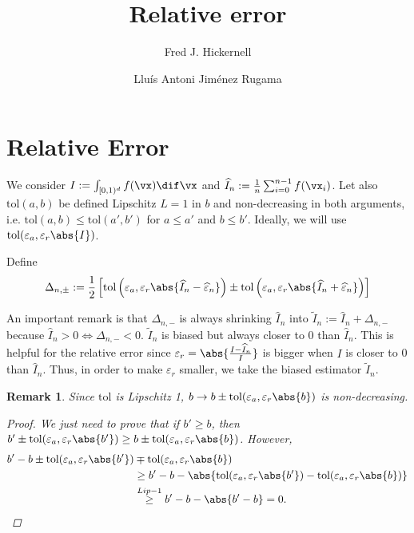\documentclass[]{elsarticle}
\newtheorem{remark}{Remark}
\theoremstyle{definition}
\newcommand{\cube}{[0,1)^d}
\newcommand{\tol}{\text{tol}}
\begin{document}
\begin{frontmatter}

\title{Relative error}
\author{Fred J. Hickernell}
\address{Room E1-208, Department of Applied Mathematics, Illinois Institute of Technology,\\ 10 W.\ 32$^{\text{nd}}$ St., Chicago, IL 60616}
\author{Llu\'{i}s Antoni Jim\'{e}nez Rugama}
\address{Room E1-120, Department of Applied Mathematics, Illinois Institute of Technology,\\ 10 W.\ 32$^{\text{nd}}$ St., Chicago, IL 60616}
\begin{abstract}
\end{abstract}

\end{frontmatter}

\section{Relative Error}
We consider $I:=\int_{\cube}f(\vx)\dif \vx$ and $\widehat{I}_n:=\frac 1 n \sum_{i=0}^{n-1}f(\vx_i)$. Let also $\tol(a,b)$ be defined Lipschitz $L=1$ in $b$ and non-decreasing in both arguments, i.e. $\tol(a,b)\leq \tol(a',b')$ for $a\leq a'$ and $b\leq b'$. Ideally, we will use $\tol(\varepsilon_a,\varepsilon_r\abs{I})$.

Define
\[ 
\Delta_{n,\pm}:=\frac 1 2 \left[ \tol\left(\varepsilon_a,\varepsilon_r\abs{\widehat{I}_n-\widehat{\varepsilon}_n}\right) \pm \tol\left(\varepsilon_a,\varepsilon_r\abs{\widehat{I}_n+\widehat{\varepsilon}_n}\right) \right]
\]

An important remark is that $\Delta_{n,-}$ is always shrinking $\widehat{I}_n$ into $\widetilde{I}_n:=\widehat{I}_n+\Delta_{n,-}$ because $\widehat{I}_n>0\Longleftrightarrow\Delta_{n,-}<0$. $\widetilde{I}_n$ is biased but always closer to 0 than $\widehat{I}_n$. This is helpful for the relative error since $\varepsilon_r=\abs{\frac{I-\widehat{I}_n}{I}}$ is bigger when $I$ is closer to 0 than $\widehat{I}_n$. Thus, in order to make $\varepsilon_r$ smaller, we take the biased estimator $\widetilde{I}_n$.

\begin{remark}
Since $\tol$ is Lipschitz 1, $b\rightarrow b\pm \tol(\varepsilon_a,\varepsilon_r\abs{b})$ is non-decreasing.
\begin{proof}
We just need to prove that if $b'\geq b$, then $b'\pm \tol(\varepsilon_a,\varepsilon_r\abs{b'})\geq b\pm \tol(\varepsilon_a,\varepsilon_r\abs{b})$. However,
\begin{align*}
b'-b \pm \tol(\varepsilon_a,\varepsilon_r\abs{b'}) &\mp \tol(\varepsilon_a,\varepsilon_r\abs{b})\\
&\geq b'-b - \abs{ \tol(\varepsilon_a,\varepsilon_r\abs{b'}) - \tol(\varepsilon_a,\varepsilon_r\abs{b})}\\
&\stackrel{Lip-1}{\geq} b'-b - \abs{b'-b} =0.
\end{align*}
\end{proof}
\end{remark}
\end{document}
